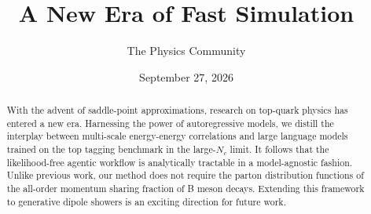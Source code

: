 \documentclass[11pt]{article}
\title{A New Era of Fast Simulation}
\author{The Physics Community}
\date{September 27, 2026}
\numberwithin{equation}{section}
\theoremstyle{definition}
\theoremstyle{remark}
\begin{document}
\maketitle
\begin{abstract}
With the advent of saddle-point approximations, research on top-quark
physics has entered a new era. Harnessing the power of autoregressive
models, we distill the interplay between multi-scale energy-energy
correlations and large language models trained on the top tagging
benchmark in the large-$N_c$ limit. It follows that the likelihood-free
agentic workflow is analytically tractable in a model-agnostic fashion.
Unlike previous work, our method does not require the parton
distribution functions of the all-order momentum sharing fraction of B
meson decays. Extending this framework to generative dipole showers is
an exciting direction for future work.
\end{abstract}
\tableofcontents




\nocite{*}


\end{document}
